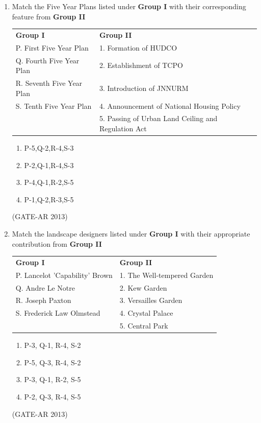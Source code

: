 \documentclass[a4paper,10pt]{article}
\begin{document}
\begin{enumerate}
    \item Match the Five Year Plans listed under \textbf{Group I} with their corresponding feature from \textbf{Group II} \\
    \begin{tabular}{ l l }
	\textbf{Group I} & \textbf{Group II} \\
	P. First Five Year Plan & 1. Formation of HUDCO \\
	Q. Fourth Five Year Plan & 2. Establishment of TCPO \\
	R. Seventh Five Year Plan & 3. Introduction of JNNURM \\
	S. Tenth Five Year Plan & 4. Announcement of National Housing Policy \\
	& 5. Passing of Urban Land Ceiling and Regulation Act \\
	\end{tabular}
	\begin{multicols}{2}
	\begin{enumerate}
        \item P-5,Q-2,R-4,S-3
        \item P-2,Q-1,R-4,S-3
        \item P-4,Q-1,R-2,S-5
        \item P-1,Q-2,R-3,S-5
    \end{enumerate}
	\end{multicols}
    \hfill (GATE-AR 2013)

    \item Match the landscape designers listed under \textbf{Group I} with their appropriate contribution from \textbf{Group II} \\
    \begin{tabular}{ l l }
	\textbf{Group I} & \textbf{Group II} \\
	P. Lancelot 'Capability' Brown & 1. The Well-tempered Garden \\
	Q. Andre Le Notre & 2. Kew Garden \\
	R. Joseph Paxton & 3. Versailles Garden \\
	S. Frederick Law Olmstead & 4. Crystal Palace \\
	& 5. Central Park \\
	\end{tabular}
	\begin{multicols}{2}
	\begin{enumerate}
        \item P-3, Q-1, R-4, S-2
        \item P-5, Q-3, R-4, S-2
        \item P-3, Q-1, R-2, S-5
        \item P-2, Q-3, R-4, S-5
    \end{enumerate}
	\end{multicols}
    \hfill (GATE-AR 2013)


\end{enumerate}
\end{document}
